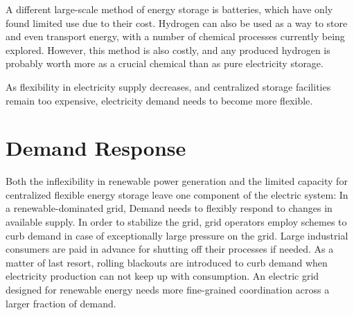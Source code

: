 A different large-scale method of energy storage is batteries, which have only found limited use due to their cost. Hydrogen can also be used as a way to store and even transport energy, with a number of chemical processes currently being explored.
However, this method is also costly, and any produced hydrogen is probably worth more as a crucial chemical than as pure electricity storage.

As flexibility in electricity supply decreases, and centralized storage facilities remain too expensive, electricity demand needs to become more flexible.


\section{Demand Response}
Both the inflexibility in renewable power generation and the limited capacity for centralized flexible energy storage leave one component of the electric system: In a renewable-dominated grid, Demand needs to flexibly respond to changes in available supply.
In order to stabilize the grid, grid operators employ schemes to curb demand in case of exceptionally large pressure on the grid.
Large industrial consumers are paid in advance for shutting off their processes if needed.
As a matter of last resort, rolling blackouts are introduced to curb demand when electricity production can not keep up with consumption.
An electric grid designed for renewable energy needs more fine-grained coordination across a larger fraction of demand.

